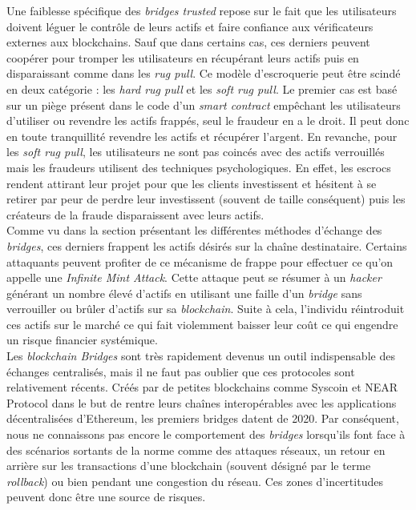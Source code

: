 Une faiblesse spécifique des \textit{bridges trusted} repose sur le fait que les utilisateurs doivent léguer le contrôle de leurs \gls{actif}s et faire confiance aux vérificateurs externes aux \gls{blockchain}s. Sauf que dans certains cas, ces derniers peuvent coopérer pour tromper les utilisateurs en récupérant leurs \gls{actif}s puis en disparaissant comme dans les \textit{rug pull}\cite{EthereumRisks}. Ce modèle d’escroquerie peut être scindé en deux catégorie : les \textit{hard rug pull} et les \textit{soft rug pull}\cite{Hacken}. Le premier cas est basé sur un piège présent dans le code d’un \textit{\gls{smart contract}} empêchant les utilisateurs d’utiliser ou revendre les \gls{actif}s frappés, seul le fraudeur en a le droit. Il peut donc en toute tranquillité revendre les \gls{actif}s et récupérer l’argent. En revanche, pour les \textit{soft rug pull}, les utilisateurs ne sont pas coincés avec des \gls{actif}s verrouillés mais les fraudeurs utilisent des techniques psychologiques. En effet, les escrocs rendent attirant leur projet pour que les clients investissent et hésitent à se retirer par peur de perdre leur investissent (souvent de taille conséquent) puis les créateurs de la fraude disparaissent avec leurs \gls{actif}s.\\

Comme vu dans la section présentant les différentes méthodes d’échange des \textit{bridges}, ces derniers frappent les \gls{actif}s désirés sur la chaîne destinataire. Certains attaquants peuvent profiter de ce mécanisme de frappe pour effectuer ce qu’on appelle une \textit{Infinite Mint Attack}.\cite{ChainLinkRisks} Cette attaque peut se résumer à un \textit{hacker} générant un nombre élevé d’\gls{actif}s en utilisant une faille d’un \textit{bridge} sans verrouiller ou brûler d’\gls{actif}s sur sa \textit{\gls{blockchain}}. Suite à cela, l’individu réintroduit ces \gls{actif}s sur le marché ce qui fait violemment baisser leur coût ce qui engendre un risque financier systémique.\\

Les \textit{\gls{blockchain} Bridges} sont très rapidement devenus un outil indispensable des échanges centralisés, mais il ne faut pas oublier que ces protocoles sont relativement récents. Créés par de petites \gls{blockchain}s comme Syscoin et NEAR Protocol dans le but de rentre leurs chaînes interopérables avec les applications décentralisées d’Ethereum, les premiers bridges datent de 2020\cite{Bitstamp}. Par conséquent, nous ne connaissons pas encore le comportement des \textit{bridges} lorsqu’ils font face à des scénarios sortants de la norme comme des attaques réseaux, un retour en arrière sur les transactions d’une \gls{blockchain} (souvent désigné par le terme \textit{rollback}) ou bien pendant une congestion du réseau. Ces zones d’incertitudes peuvent donc être une source de risques. \\

